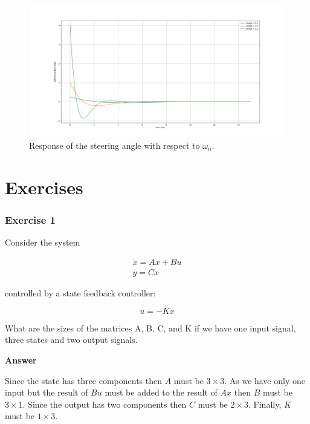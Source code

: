 \begin{figure}[!htb]
\begin{center}
\includegraphics[scale=0.280]{img/state_feedback/delta_response.png}
\end{center}
\caption{Response of the steering angle with respect  to $\omega_n$.}
\label{delta_response}
\end{figure}

\section{Exercises}

\subsubsection{Exercise 1}

Consider the system 

\begin{eqnarray}
\dot{x} = Ax + Bu \\
y = Cx 
\end{eqnarray}

controlled by a state feedback controller: 

\begin{equation}
 u = -Kx  
\end{equation}

What are  the sizes of the matrices A, B, C, and K if we have one input signal, three states and two output signals.

\textbf{Answer}

Since the state has three components then $A$ must be $3\times 3$. As we have only one input but the result of $Bu$ must be added to the result of $Ax$ then $B$ must be $3\times 1$.
Since the output has two components then $C$ must be $2\times 3$. Finally, $K$ must be $1\times 3$.

